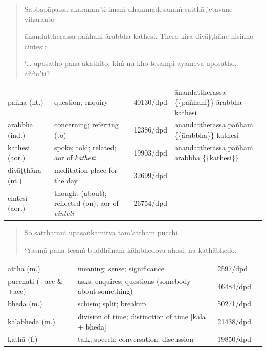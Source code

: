 \documentclass[11pt,oneside]{memoir}
\begin{document}
\vspace*{-\baselineskip}
\enlargethispage*{2\baselineskip}

\begin{quote}
Sabbapāpassa akaraṇan'ti imaṁ dhammadesanaṁ satthā jetavane viharanto

ānandattherassa pañhaṁ ārabbha kathesi. Thero kira divāṭṭhāne nisinno cintesi:

`\ldots{} uposatho pana akathito, kiṁ nu kho tesampi ayameva uposatho, añño'ti?
\end{quote}

\vspace*{-0.5\baselineskip}

\begin{longtable}{L{\colOne} L{\colTwo} H H}
pañha (nt.) & question; enquiry & 40130/dpd & ānandattherassa \{\{pañhaṁ\}\} ārabbha kathesi\\[0pt]
ārabbha (ind.) & concerning; referring (to) & 12386/dpd & ānandattherassa pañhaṁ \{\{ārabbha\}\} kathesi\\[0pt]
kathesi (aor.) & spoke; told; related; aor of \emph{katheti} & 19903/dpd & ānandattherassa pañhaṁ ārabbha \{\{kathesi\}\}\\[0pt]
divāṭṭhāna (nt.) & meditation place for the day & 32699/dpd & \\[0pt]
cintesi (aor.) & thought (about); reflected (on); aor of \emph{cinteti} & 26754/dpd & \\[0pt]
\end{longtable}

\clearpage
\casesLegendHeaderBGHere

\begin{quote}
So satthāraṁ upasaṅkamitvā tam'atthaṁ pucchi.

`Yasmā pana tesaṁ buddhānaṁ kālabhedova ahosi, na kathābhedo.
\end{quote}

\begin{longtable}{L{\colOne} L{\colTwo} H H}
attha (m.) & meaning; sense; significance & 2597/dpd & \\[0pt]
pucchati (+acc \& +acc) & asks; enquires; questions (somebody about something) & 46484/dpd & \\[0pt]
bheda (m.) & schism; split; breakup & 50271/dpd & \\[0pt]
kālabheda (m.) & division of time; distinction of time [kāla + bheda] & 21438/dpd & \\[0pt]
kathā (f.) & talk; speech; conversation; discussion & 19850/dpd & \\[0pt]
\end{longtable}
\end{document}
